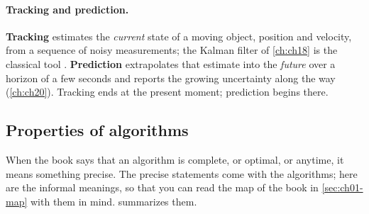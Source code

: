 \paragraph{Tracking and prediction.}
\textbf{Tracking} estimates the \emph{current} state of a moving
object, position and velocity, from a sequence of noisy measurements; the Kalman
filter of \cref{ch:ch18} is the classical tool \cite{thrun2005probabilistic}.
\textbf{Prediction} extrapolates that estimate into the
\emph{future} over a horizon of a few seconds and reports the growing uncertainty
along the way (\cref{ch:ch20}). Tracking ends at the present moment; prediction
begins there.

\subsection{Properties of algorithms}
\label{sec:ch01-properties}

When the book says that an algorithm is complete, or optimal, or anytime, it means
something precise. The precise statements come with the algorithms; here are the
informal meanings, so that you can read the map of the book in
\cref{sec:ch01-map} with them in mind.  summarizes them.

